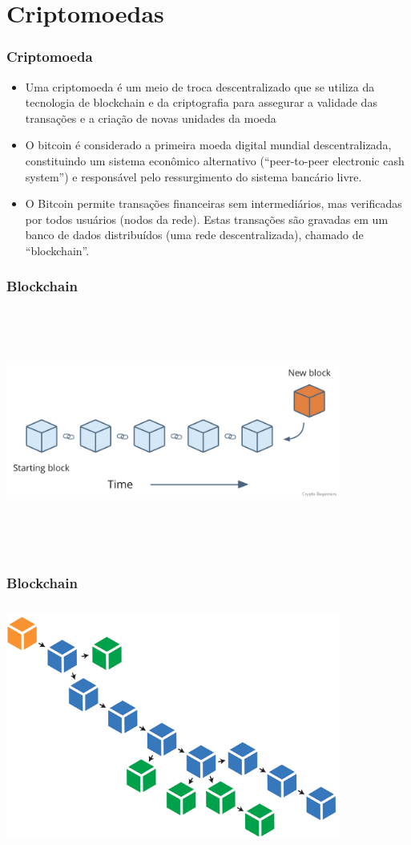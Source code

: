 \documentclass{beamer}
\begin{document}
\section{Criptomoedas}

\begin{frame}
  \frametitle{Criptomoeda}
\begin{itemize}
    \item Uma criptomoeda é um meio de troca descentralizado que se utiliza da tecnologia de blockchain e da criptografia para assegurar a validade das transações e a criação de novas unidades da moeda
    \item O bitcoin é considerado a primeira moeda digital mundial descentralizada, constituindo um sistema econômico alternativo (\foreignquote{english}{peer-to-peer electronic cash system}) e responsável pelo ressurgimento do sistema bancário livre.
    \item O Bitcoin permite transações financeiras sem intermediários, mas verificadas por todos usuários (nodos da rede). Estas transações são gravadas em um banco de dados distribuídos (uma rede descentralizada), chamado de \foreignquote{english}{blockchain}.
    \end{itemize}
\end{frame}

\begin{frame}
\frametitle{Blockchain}
\includegraphics[width=11cm, height=8cm]{blockchain1}
\end{frame}

\begin{frame}
\frametitle{Blockchain}
\includegraphics[width=11cm, height=8cm]{blockchain2}
\end{frame}
\end{document}
